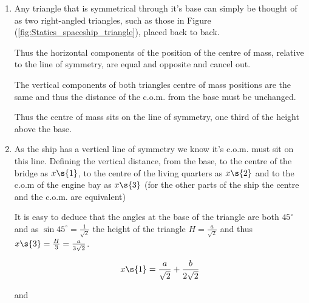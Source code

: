 \begin{problem}
{\begin{enumerate}
	\begin{equation}	G = \int_0^L \frac{\rho H x^2}{L}~ \d{x} = \frac{\rho H}{L}\left[\frac{x^3}{3}\right]^L_0 = \frac{\rho H L^2}{3}  \end{equation}
	
	Also we know $M = \rho A = \rho \frac{H L}{2}$
	
	And therefore:
	
	\begin{equation}	 \rho \frac{H L}{2} D =  \frac{\rho H L^2}{3} 
	 \Rightarrow D = \frac{2L}{3} \end{equation}
	
	Thus the centre of mass lies two thirds of the distance from the tip, and thus one third of the distance from the base.
	
	\item Any triangle that is symmetrical through it's base can simply be thought of as two right-angled triangles, such as those in Figure (\ref{fig:Statics_spaceship_triangle}), placed back to back.
	
	Thus the horizontal components of the position of the centre of mass, relative to the line of symmetry, are equal and opposite and cancel out.
	
	The vertical components of both triangles centre of mass positions are the same and thus the distance of the c.o.m. from the base must be unchanged.
	
	Thus the centre of mass sits on the line of symmetry, one third of the height above the base.
	
	\item
	
	As the ship has a vertical line of symmetry we know it's c.o.m. must sit on this line. Defining the vertical distance, from the base, to the centre of the bridge as $x\s{1}$, to the centre of the living quarters as $x\s{2}$ and to the c.o.m of the engine bay as $x\s{3}$ (for the other parts of the ship the centre and the c.o.m. are equivalent)
	
	It is easy to deduce that the angles at the base of the triangle are both $45^{\circ}$ and as $\sin{45^{\circ}} = \frac{1}{\sqrt{2}}$ the height of the triangle $H = \frac{a}{\sqrt2}$ and thus $x\s{3} = \frac{H}{3} = \frac{a}{3\sqrt{2}}$.
	
	\begin{equation}	x\s{1} = \frac{a}{\sqrt{2}} +  \frac{b}{2\sqrt{2}} \end{equation}
	
	and
	

\end{enumerate}}
\end{problem}
